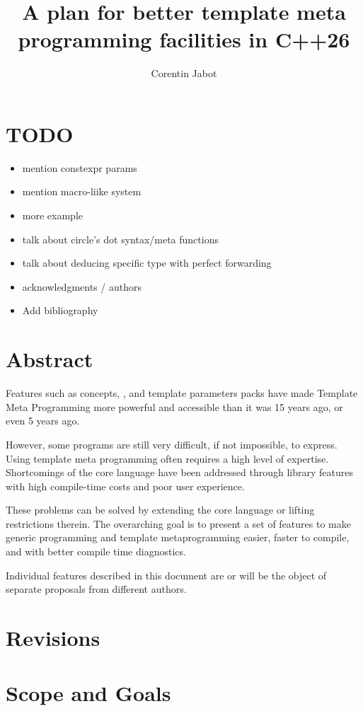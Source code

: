 \documentclass{wg21}
\title{A plan for better template meta programming facilities in C++26}
\author{Corentin Jabot}{corentin.jabot@gmail.com}
\begin{document}
\maketitle

\section{TODO}
\begin{itemize}
\item mention constexpr params
\item mention macro-liike system
\item more example
\item talk about circle's dot syntax/meta functions
\item talk about deducing specific type with perfect forwarding
\item acknowledgments / authors
\item Add bibliography
\end{itemize}

\section{Abstract}

Features such as concepts, , and template parameters packs have made Template Meta Programming more powerful and accessible than it was 15 years ago, or even 5 years ago.

However, some programs are still very difficult, if not impossible, to express. Using template meta programming often requires a high level of expertise.
Shortcomings of the core language have been addressed through library features with high compile-time costs and poor user experience.

These problems can be solved by extending the core language or lifting restrictions therein.
The overarching goal is to present a set of features to make generic programming and template metaprogramming easier, faster to compile, and with better compile time diagnostics.

Individual features described in this document are or will be the object of separate proposals from different authors.



\section{Revisions}


\section{Scope and Goals}
\end{document}
